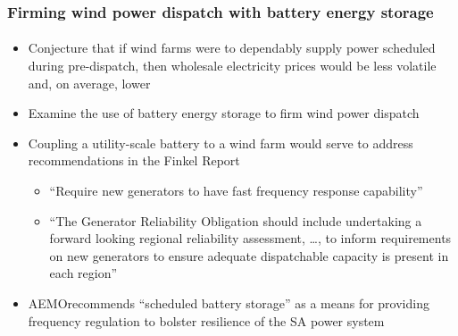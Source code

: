 \documentclass[presentation, smaller, table, svgnames]{beamer}
\begin{document}
\begin{frame}
	\frametitle{Firming wind power dispatch with battery energy storage}
	\framesubtitle{}

	\begin{itemize}
		\item  Conjecture that if wind farms were to dependably supply power scheduled during pre-dispatch, then wholesale electricity prices would be less volatile and, on average, lower
		
		\item  Examine the use of battery energy storage to firm wind power dispatch
		
		\item  Coupling a utility-scale battery to a wind farm would serve to address recommendations in the Finkel Report\footnotemark[4]
		\begin{itemize}
			\item  ``Require new generators to have fast frequency response capability''
			\item  ``The Generator Reliability Obligation should include undertaking a forward looking regional reliability assessment, \ldots, to inform requirements on new generators to ensure adequate dispatchable capacity is present in each region''
		\end{itemize}
		
		\item  AEMO\footnotemark[5] recommends ``scheduled battery storage'' as a means for providing frequency regulation to bolster resilience of the SA power system
	\end{itemize}
	
\footnotesize{

\par
}

\end{frame}

\end{document}
